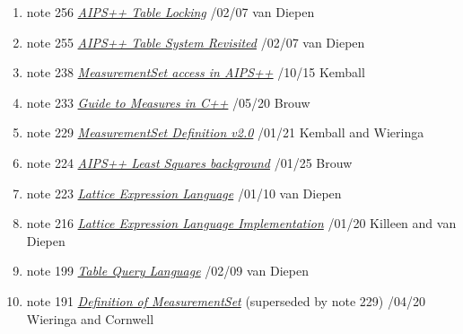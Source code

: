 %

\begin{enumerate}

\item
note 256
\href{256.html}{\textit{AIPS++ Table Locking}}
/02/07 van Diepen

\item
note 255
\href{255.html}{\textit{AIPS++ Table System Revisited}}
/02/07 van Diepen

\item
note 238
\href{238.html}{\textit{MeasurementSet access in AIPS++}}
/10/15 Kemball

\item
note 233
\href{233.html}{\textit{Guide to Measures in C++}}
/05/20 Brouw

\item
note 229
\href{229.html}{\textit{MeasurementSet Definition v2.0}}
/01/21 Kemball and Wieringa

\item
note 224
\href{224.html}{\textit{AIPS++ Least Squares background}}
/01/25 Brouw

\item
note 223
\href{223.html}{\textit{Lattice Expression Language}}
/01/10 van Diepen

\item
note 216
\href{216.html}{\textit{Lattice Expression Language Implementation}}
/01/20 Killeen and van Diepen

\item
note 199
\href{199.html}{\textit{Table Query Language}}
/02/09 van Diepen

\item
note 191
\href{191.html}{\textit{Definition of MeasurementSet}} (superseded by
  note 229)
/04/20 Wieringa and Cornwell

\end{enumerate}
